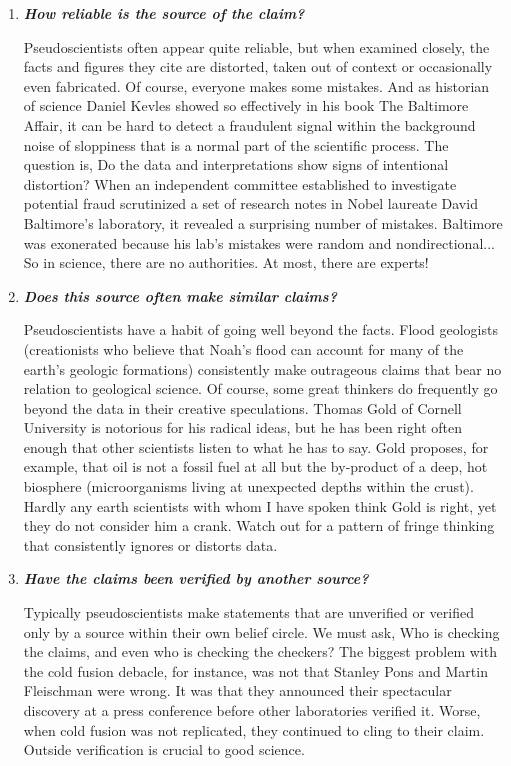 	\begin{enumerate}
		\item \textit{\textbf{How reliable is the source of the claim?}}

		Pseudoscientists often appear quite reliable, but when examined closely, the facts and figures they cite are distorted, taken out of context or occasionally even fabricated. Of course, everyone makes some mistakes. And as historian of science Daniel Kevles showed so effectively in his book The Baltimore Affair, it can be hard to detect a fraudulent signal within the background noise of sloppiness that is a normal part of the scientific process. The question is, Do the data and interpretations show signs of intentional distortion? When an independent committee established to investigate potential fraud scrutinized a set of research notes in Nobel laureate David Baltimore's laboratory, it revealed a surprising number of mistakes. Baltimore was exonerated because his lab's mistakes were random and nondirectional... So in science, there are no authorities. At most, there are experts!

		\item \textit{\textbf{Does this source often make similar claims?}}

		Pseudoscientists have a habit of going well beyond the facts. Flood geologists (creationists who believe that Noah's flood can account for many of the earth's geologic formations) consistently make outrageous claims that bear no relation to geological science. Of course, some great thinkers do frequently go beyond the data in their creative speculations. Thomas Gold of Cornell University is notorious for his radical ideas, but he has been right often enough that other scientists listen to what he has to say. Gold proposes, for example, that oil is not a fossil fuel at all but the by-product of a deep, hot biosphere (microorganisms living at unexpected depths within the crust). Hardly any earth scientists with whom I have spoken think Gold is right, yet they do not consider him a crank. Watch out for a pattern of fringe thinking that consistently ignores or distorts data.

		\item \textit{\textbf{Have the claims been verified by another source?}}

		Typically pseudoscientists make statements that are unverified or verified only by a source within their own belief circle. We must ask, Who is checking the claims, and even who is checking the checkers? The biggest problem with the cold fusion debacle, for instance, was not that Stanley Pons and Martin Fleischman were wrong. It was that they announced their  spectacular discovery at a press conference before other laboratories verified it. Worse, when cold fusion was not replicated, they continued to cling to their claim. Outside verification is crucial to good science.


\end{enumerate}
